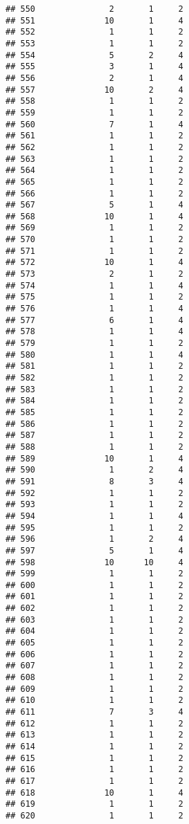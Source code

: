 \documentclass[
]{article}
\begin{document}
\begin{verbatim}
## 550               2       1     2
## 551              10       1     4
## 552               1       1     2
## 553               1       1     2
## 554               5       2     4
## 555               3       1     4
## 556               2       1     4
## 557              10       2     4
## 558               1       1     2
## 559               1       1     2
## 560               7       1     4
## 561               1       1     2
## 562               1       1     2
## 563               1       1     2
## 564               1       1     2
## 565               1       1     2
## 566               1       1     2
## 567               5       1     4
## 568              10       1     4
## 569               1       1     2
## 570               1       1     2
## 571               1       1     2
## 572              10       1     4
## 573               2       1     2
## 574               1       1     4
## 575               1       1     2
## 576               1       1     4
## 577               6       1     4
## 578               1       1     4
## 579               1       1     2
## 580               1       1     4
## 581               1       1     2
## 582               1       1     2
## 583               1       1     2
## 584               1       1     2
## 585               1       1     2
## 586               1       1     2
## 587               1       1     2
## 588               1       1     2
## 589              10       1     4
## 590               1       2     4
## 591               8       3     4
## 592               1       1     2
## 593               1       1     2
## 594               1       1     4
## 595               1       1     2
## 596               1       2     4
## 597               5       1     4
## 598              10      10     4
## 599               1       1     2
## 600               1       1     2
## 601               1       1     2
## 602               1       1     2
## 603               1       1     2
## 604               1       1     2
## 605               1       1     2
## 606               1       1     2
## 607               1       1     2
## 608               1       1     2
## 609               1       1     2
## 610               1       1     2
## 611               7       3     4
## 612               1       1     2
## 613               1       1     2
## 614               1       1     2
## 615               1       1     2
## 616               1       1     2
## 617               1       1     2
## 618              10       1     4
## 619               1       1     2
## 620               1       1     2

\end{verbatim}
\end{document}
